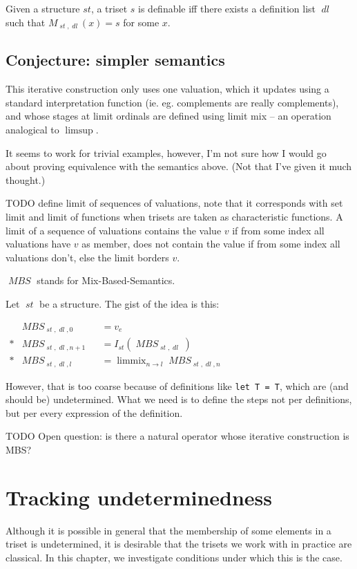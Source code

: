 \documentclass[oneside,12pt]{book}
\newcounter{question}
\theoremstyle{definition}
\theoremstyle{remark}
\newcommand{\tde}{\raisebox{0.5ex}{\texttildelow}}
\newcommand\var[1]{\mathop{\mathit{#1}}\nolimits}
\newcommand{\st}{\var{st}}
\newcommand{\dl}{\var{dl}}
\DeclareMathOperator{\mix}{mix}
\DeclareMathOperator*{\limMix}{\lim \mix}
\newcommand{\MBS}{\var{MBS}}
\begin{document}
\begin{defBox}
  Given a structure $st$, a triset $s$ is definable iff there exists
  a definition list $\dl$ such that $M_{\st,\dl}(x) = s$ for some $x$.
\end{defBox}


\section{Conjecture: simpler semantics}
This iterative construction only uses one valuation, which it updates using a standard
interpretation function (ie. eg. complements are really complements), and whose
stages at limit ordinals are defined using limit mix -- an operation analogical
to $\limsup$.

It seems to work for trivial examples, however, I'm not sure how I would go about
proving equivalence with the semantics above. (Not that I've given it much thought.)

TODO define limit of sequences of valuations, note that it corresponds with set limit
and limit of functions when trisets are taken as characteristic functions.
A limit of a sequence of valuations contains the value $v$
if from some index all valuations have $v$ as member, does not contain
the value if from some index all valuations don't, else the limit borders $v$.

$\MBS$ stands for Mix-Based-Semantics.

\begin{defBox}
  Let $\st$ be a structure. The gist of the idea is this:
  
  \medskip \noindent
  $\begin{aligned}
    & \MBS_{\st,\dl,0} & &= v_e \\*
    & \MBS_{\st,\dl,n+1} & &= I_{\st}(\MBS_{\st,\dl}) \\*
    & \MBS_{\st,\dl,l} & &= \limMix_{n \to l} \MBS_{\st,\dl,n}
  \end{aligned}$
\end{defBox}

However, that is too coarse because of definitions like \texttt{let T = \tde \tde T},
which are (and should be) undetermined. What we need is to define the steps not
per definitions, but per every expression of the definition.

TODO
Open question: is there a natural operator whose iterative construction is MBS?


\chapter{Tracking undeterminedness}
Although it is possible in general that the membership of some elements in a triset
is undetermined, it is desirable that the trisets we work with in practice are
classical. In this chapter, we investigate conditions under which this is the case.
\end{document}
